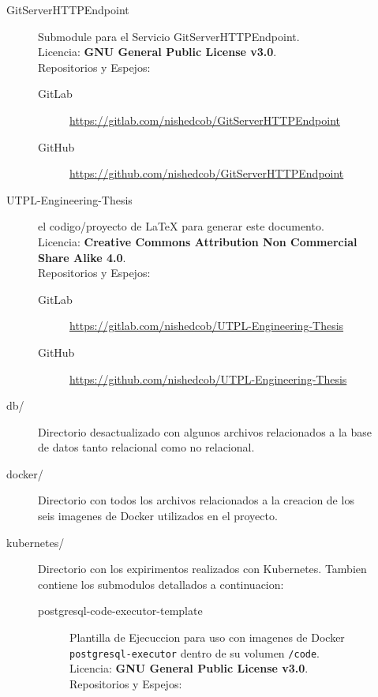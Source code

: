 \begin{description}
\begin{description}
\begin{description}
\begin{description}
            \end{description}
        \end{description}
        \item[GitServerHTTPEndpoint] Submodule para el Servicio GitServerHTTPEndpoint. \\
        Licencia: \textbf{GNU General Public License v3.0}. \\
        Repositorios y Espejos:
        \begin{description}
        	\item[GitLab] \sloppy \url{https://gitlab.com/nishedcob/GitServerHTTPEndpoint}
            \item[GitHub] \sloppy \url{https://github.com/nishedcob/GitServerHTTPEndpoint}
        \end{description}
        \item[UTPL-Engineering-Thesis] el codigo/proyecto de LaTeX para generar este documento. \\
        Licencia: \textbf{Creative Commons Attribution Non Commercial Share Alike 4.0}. \\
        Repositorios y Espejos:
        \begin{description}
        	\item[GitLab] \sloppy \url{https://gitlab.com/nishedcob/UTPL-Engineering-Thesis}
            \item[GitHub] \sloppy \url{https://github.com/nishedcob/UTPL-Engineering-Thesis}
        \end{description}
        \item[db/] Directorio desactualizado con algunos archivos relacionados a la base de datos tanto relacional como no relacional.
        \item[docker/] Directorio con todos los archivos relacionados a la creacion de los seis imagenes de Docker utilizados en el proyecto.
        \item[kubernetes/] Directorio con los expirimentos realizados con Kubernetes. Tambien contiene los submodulos detallados a continuacion:
        \begin{description}
        	\item[postgresql-code-executor-template] Plantilla de Ejecuccion para uso con imagenes de Docker \texttt{postgresql-executor} dentro de su volumen \texttt{/code}.\\
            Licencia: \textbf{GNU General Public License v3.0}. \\
            Repositorios y Espejos:
            \begin{description}

\end{description}
\end{description}
\end{description}
\end{description}
